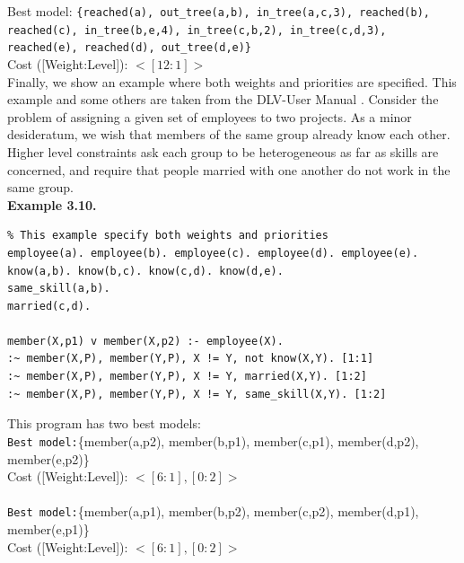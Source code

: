 \documentclass[14pt,a4paper, titlepage]{article}
\begin{document}
Best model: \texttt{\{reached(a), out\_tree(a,b), in\_tree(a,c,3), reached(b), reached(c), in\_tree(b,e,4), in\_tree(c,b,2), in\_tree(c,d,3), reached(e), reached(d), out\_tree(d,e)\}}
\\Cost ([Weight:Level]): $<[12:1]>$
\\Finally, we show an example where both weights and priorities are specified. This example and some others are taken from the DLV-User Manual \cite{dlvum}. Consider the problem of assigning a given set of employees to two projects. As a minor desideratum, we wish that members of the same group already know each other. Higher level constraints ask each group to be heterogeneous as far as skills are concerned, and require that people married with one another do not work in the same group.
\\ \textbf{Example 3.10.}
\begin{lstlisting}
% This example specify both weights and priorities
employee(a). employee(b). employee(c). employee(d). employee(e).
know(a,b). know(b,c). know(c,d). know(d,e).
same_skill(a,b).
married(c,d).

member(X,p1) v member(X,p2) :- employee(X).
:~ member(X,P), member(Y,P), X != Y, not know(X,Y). [1:1]
:~ member(X,P), member(Y,P), X != Y, married(X,Y). [1:2]
:~ member(X,P), member(Y,P), X != Y, same_skill(X,Y). [1:2] 
\end{lstlisting}
This program has two best models:
\\ \texttt{Best model:}\{member(a,p2), member(b,p1), member(c,p1), member(d,p2), member(e,p2)\}
\\Cost ([Weight:Level]): $<[6:1],[0:2]>$
\\ \\ \texttt{Best model:}\{member(a,p1), member(b,p2), member(c,p2), member(d,p1), member(e,p1)\}
\\Cost ([Weight:Level]): $<[6:1],[0:2]>$
\end{document}
